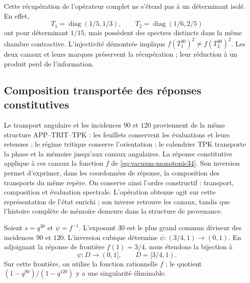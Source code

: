 Cette récupération de l'opérateur complet ne s'étend pas à un déterminant isolé. En effet,
\[
 T_1=\operatorname{diag}(1/5,1/3),\qquad
 T_2=\operatorname{diag}(1/6,2/5)
\]
ont pour déterminant \(1/15\), mais possèdent des spectres distincts dans la même chambre contractive. L'injectivité démontrée implique \(f(T_1^{30})^2\ne f(T_2^{30})^2\). Les deux canaux et leurs marques préservent la récupération ; leur réduction à un produit perd de l'information.

\subsection{Composition transportée des réponses constitutives}
\label{cr28:comp-sec}

Le transport angulaire et les incidences $90$ et $120$ proviennent de la
même structure APP--TRIT--TPK : les feuillets conservent les évaluations et
leurs retenues ; le régime tritique conserve l’orientation ; le calendrier
TPK transporte la phase et la mémoire jusqu’aux canaux angulaires. La réponse
constitutive applique à ces canaux la fonction $f$ de
\eqref{eq:vacuum-monotonic34}. Son inversion permet d’exprimer, dans les coordonnées
de réponse, la composition des transports du même repère. On conserve
ainsi l’ordre constructif : transport, composition et évaluation spectrale.
L’opération obtenue agit sur cette représentation de l’état enrichi ;
son inverse retrouve les canaux, tandis que l’histoire complète de mémoire
demeure dans la structure de provenance.

Soient $s=q^{30}$ et $\psi=f^{-1}$. L’exposant $30$ est le plus grand commun
diviseur des incidences $90$ et $120$. L’inversion cubique détermine
$\psi:(3/4,1)\longrightarrow(0,1)$. En adjoignant la réponse de frontière
$f(1)=3/4$, nous étendons la bijection à
\[
 \psi:D\longrightarrow(0,1],\qquad D=[3/4,1).
\]
Sur cette frontière, on utilise la fonction rationnelle $f$ ; le quotient
$(1-q^{90})/(1-q^{120})$ y a une singularité éliminable.

